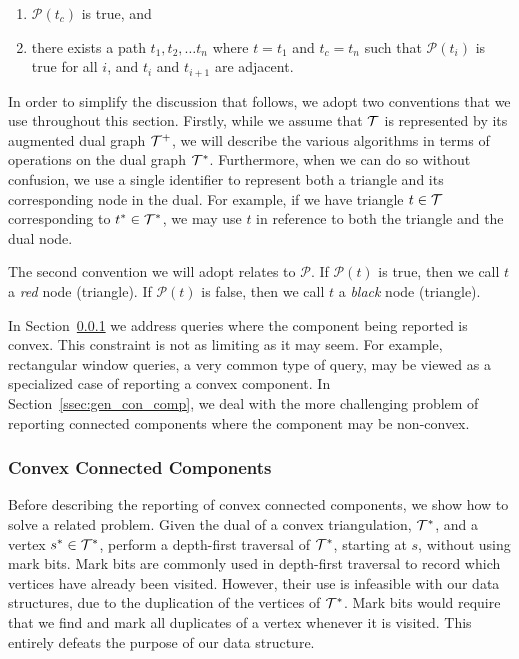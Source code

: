   \begin{enumerate}
    \item $\mathcal{P}(t_c)$ is true, and
    \item there exists a path $t_1, t_2, \ldots t_n$ where $t = t_1$ and 
    $t_c = t_n$ such that $\mathcal{P}(t_i)$ is true for all $i$, and $t_i$ 
    and $t_{i+1}$ are adjacent.
  \end{enumerate}

  In order to simplify the discussion that follows, we adopt two conventions that we use
  throughout this section. 
  Firstly, while we assume that $\mathcal{T}$ is represented by its augmented dual
  graph $\mathcal{T}^+$, we will describe the various algorithms in terms
  of operations on the dual graph $\mathcal{T}^*$. 
  Furthermore, when we can do so without confusion, we use a single identifier
  to represent both a triangle and its corresponding node in the dual.
  For example, if we have triangle $t \in \mathcal{T}$ corresponding to  
  $t^* \in \mathcal{T}^*$, we may use $t$ in reference to both the
  triangle and the dual node.

  The second convention we will adopt relates to $\mathcal{P}$.
  If $\mathcal{P}(t)$ is true, then we call $t$ a \emph{red} node (triangle).  
  If $\mathcal{P}(t)$ is false, then we call $t$ a \emph{black} node (triangle).

  In Section~\ref{ssec:conv_con_comp} we address queries 
  where the component being reported is convex. 
  This constraint is not as limiting as it may seem.
  For example, rectangular window queries, a very common type of query, 
  may be viewed as a specialized case of reporting a convex 
  component.
  In Section~\ref{ssec:gen_con_comp}, we deal with the more challenging 
  problem of reporting
  connected components where the component may be non-convex.

  \subsubsection{Convex Connected Components}\label{ssec:conv_con_comp}

  Before describing the reporting of convex connected components, we show how 
  to solve a related problem. 
  Given the dual of a convex triangulation, $\mathcal{T}^*$, and a 
  vertex $s^* \in \mathcal{T}^*$, 
  perform a depth-first traversal of $\mathcal{T}^*$, starting at $s$, without 
  using mark bits.
  Mark bits are commonly used in depth-first traversal to record which vertices 
  have already been visited. 
  However, their use is infeasible with our data structures, due to the 
  duplication of the vertices of $\mathcal{T}^*$.
  Mark bits would require that we find and mark all duplicates of 
  a vertex whenever it is visited.
  This entirely defeats the purpose of our data structure.


